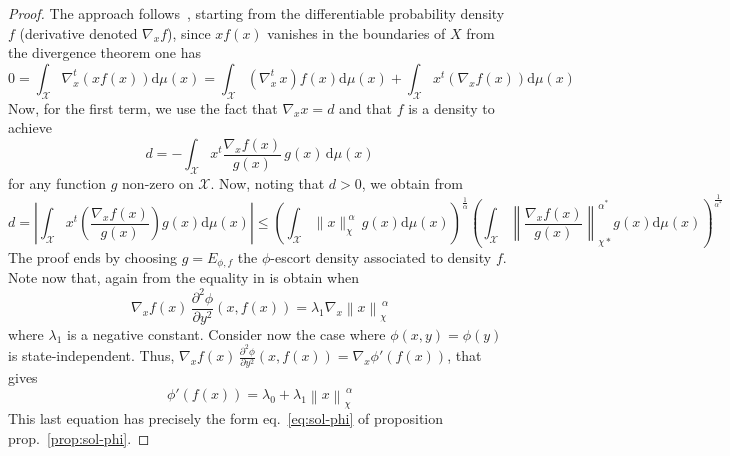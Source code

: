 \documentclass[english,sort&compress]{elsarticle}
\theoremstyle{definition}
\theoremstyle{plain}
\theoremstyle{plain}
\def\dmu{\mathrm{d}\mu}
\def\X{\mathcal{X}}
\begin{document}
\begin{proof}
  The   approach   follows~\cite{Ber13},   starting  from   the   differentiable
  probability  density $f$  (derivative denoted  $\nabla_x f$),  since  $x f(x)$
  vanishes in the boundaries of $X$ from the divergence theorem one has
  \[
  0  =  \int_\X  \nabla_x^t \left(  x  f(x)  \right)  \dmu(x) =  \int_\X  \left(
    \nabla_x^t  \, x \right)  f(x) \dmu(x)  + \int_\X  x^t \left(  \nabla_x f(x)
  \right) \dmu(x)
  \]
  Now, for the first term, we use the fact that $\nabla_x x = d$ and that $f$ is
  a density to achieve
  \[
  d = - \int_\X x^t \frac{\nabla_x f(x)}{g(x)} \, g(x) \, \dmu(x)
  \]
  for any function  $g$ non-zero on $\X$.   Now, noting that $d >  0$, we obtain
  from \cite[Lemma 2]{Ber13}
  \[
  d  =  \left| \int_\X x^t \left( \frac{\nabla_x f(x)}{g(x)} \right) g(x)
  \dmu(x) \right| \le  \left( \int_\X \|x\|_\chi^{\: \alpha} \, g(x) \dmu(x)
  \right)^{\frac{1}{\alpha}} \left( \int_\X \left\| \frac{\nabla_x
  f(x)}{g(x)}\right\|_{\chi*}^{\alpha^*} g(x) \dmu(x) \right)^{\frac{1}{\alpha^*}}
  \]
  The  proof  ends  by  choosing  $g =  E_{\phi,f}$  the  $\phi$-escort  density
  associated to density $f$. Note now that, again from \cite[Lemma~2]{Ber13} the
  equality in is obtain when
  \[
  \nabla_x  f(x) \,  \frac{\partial^2 \phi}{\partial  y^2} (x,f(x))  = \lambda_1
  \nabla_x \left\| x \right\|_\chi^{\, \alpha}
  \]
  where  $\lambda_1$  is a  negative  constant.   Consider  now the  case  where
  $\phi(x,y)  =   \phi(y)$  is   state-independent.  Thus,  $\nabla_x   f(x)  \,
  \frac{\partial^2  \phi}{\partial y^2} (x,f(x))  = \nabla_x  \phi'(f(x))$, that
  gives
  \[
  \phi'(f(x)) = \lambda_0 + \lambda_1 \left\| x \right\|_\chi^{\, \alpha}
  \]
  This  last   equation  has   precisely  the  form   eq.~\eqref{eq:sol-phi}  of
  proposition prop.~\ref{prop:sol-phi}.
\end{proof}
\end{document}
